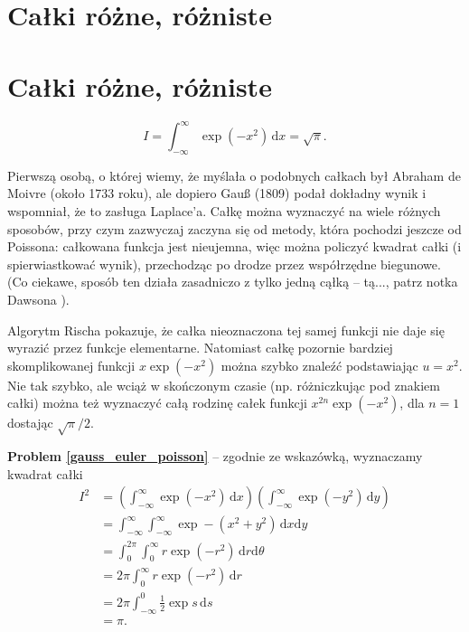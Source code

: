 
\section{Całki różne, różniste}
\section{Całki różne, różniste}

\begin{problem_with_solution}
    \label{gauss_euler_poisson}%
    \begin{equation}
        I = \int_{-\infty}^\infty \exp \left( -x^2 \right) \,\mathrm{d} x = \sqrt{\pi}.
    \end{equation}
\end{problem_with_solution}

Pierwszą osobą, o której wiemy, że myślała o podobnych całkach był Abraham de Moivre (około 1733 roku), ale dopiero Gauß (1809) podał dokładny wynik i wspomniał, że to zasługa Laplace'a.
Całkę można wyznaczyć na wiele różnych sposobów, przy czym zazwyczaj zaczyna się od metody, która pochodzi jeszcze od Poissona: całkowana funkcja jest nieujemna, więc można policzyć kwadrat całki (i spierwiastkować wynik), przechodząc po drodze przez współrzędne biegunowe.
(Co ciekawe, sposób ten działa zasadniczo z tylko jedną cąłką -- tą..., patrz notka Dawsona \cite{dawson05}).

Algorytm Rischa pokazuje, że całka nieoznaczona tej samej funkcji nie daje się wyrazić przez funkcje elementarne.
Natomiast całkę pozornie bardziej skomplikowanej funkcji $x \exp (-x^2)$ można szybko znaleźć podstawiając $u = x^2$.
Nie tak szybko, ale wciąż w skończonym czasie (np. różniczkując pod znakiem całki) można też wyznaczyć całą rodzinę całek funkcji $x^{2n} \exp(-x^2)$, dla $n = 1$ dostając $\sqrt{\pi}/2$.

\textbf{Problem \ref{gauss_euler_poisson}} -- zgodnie ze wskazówką, wyznaczamy kwadrat całki
\begin{align}
    I^2 & = \left(\int_{-\infty}^\infty \exp \left( -x^2 \right) \,\mathrm{d}x\right)\left(\int_{-\infty}^\infty \exp \left( -y^2 \right) \,\mathrm{d}y\right) \\
    & = \int_{-\infty}^\infty \int_{-\infty}^\infty \exp - \left(x^2+y^2\right) \,\mathrm{d}x \mathrm{d}y \\
    & = \int_0^{2\pi} \int_0^\infty r \exp (-r^2) \,\mathrm{d}r \mathrm{d}\theta \\
    & = 2\pi \int_0^\infty r \exp (-r^2) \,\mathrm{d} r \\
    & = 2\pi \int^0_{-\infty} \frac 1 2 \exp s \,\mathrm{d} s \\
    & = \pi.
\end{align}

